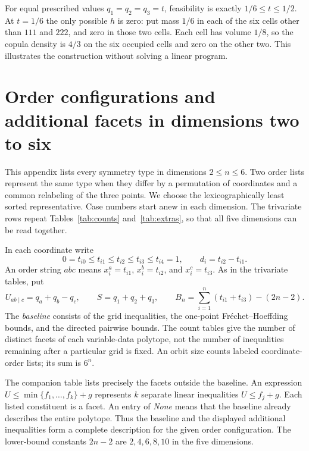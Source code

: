 \documentclass[a4paper,11pt]{amsart}
\numberwithin{equation}{section}
\theoremstyle{definition}
\theoremstyle{remark}
\begin{document}
For equal prescribed values $q_1=q_2=q_3=t$, feasibility is exactly
$1/6\leq t\leq1/2$. At $t=1/6$ the only possible $h$ is zero:
put mass $1/6$ in each of the six cells other than $111$ and $222$,
and zero in those two cells. Each cell has volume $1/8$, so the copula
density is $4/3$ on the six occupied cells and zero on the other two.
This illustrates the construction without solving a linear program.

\clearpage
\appendix
\raggedbottom
\section{Order configurations and additional facets in dimensions two to six}
\label{app:all-tables}
This appendix lists every symmetry type in dimensions $2\leq n\leq6$.
Two order lists represent the same type when they differ by a permutation
of coordinates and a common relabeling of the three points. We choose the
lexicographically least sorted representative. Case numbers start anew in
each dimension. The trivariate rows repeat Tables~\ref{tab:counts}
and~\ref{tab:extras}, so that all five dimensions can be read together.

In each coordinate write
\[
0=t_{i0}\leq t_{i1}\leq t_{i2}\leq t_{i3}\leq t_{i4}=1,
\qquad d_i=t_{i2}-t_{i1}.
\]
An order string $abc$ means
$x_i^a=t_{i1}$, $x_i^b=t_{i2}$, and $x_i^c=t_{i3}$.
As in the trivariate tables, put
\[
U_{ab\mid c}=q_a+q_b-q_c,\qquad
S=q_1+q_2+q_3,\qquad
B_n=\sum_{i=1}^n(t_{i1}+t_{i3})-(2n-2).
\]
The \emph{baseline} consists of the grid inequalities, the one-point
Fr\'echet--Hoeffding bounds, and the directed pairwise bounds. The count
tables give the number of distinct facets of each variable-data polytope,
not the number of inequalities remaining after a particular grid is fixed.
An orbit size counts labeled coordinate-order lists; its sum is $6^n$.

The companion table lists precisely the facets outside the baseline.
An expression $U\leq\min\{f_1,\ldots,f_k\}+g$ represents $k$ separate
linear inequalities $U\leq f_j+g$. Each listed constituent is a facet.
An entry of \emph{None} means that the baseline already describes the
entire polytope. Thus the baseline and the displayed additional inequalities
form a complete description for the given order configuration.
The lower-bound constants $2n-2$ are $2,4,6,8,10$ in the five dimensions.
\end{document}
